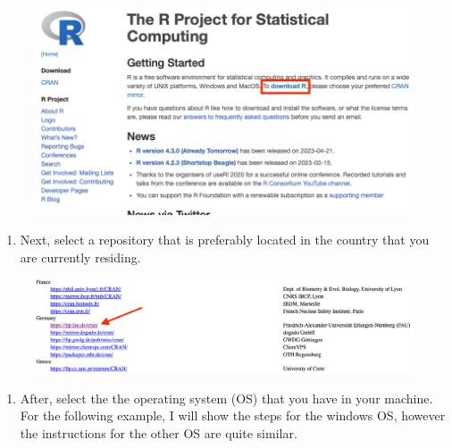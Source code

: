 \documentclass[
  letterpaper,
  DIV=11,
  numbers=noendperiod]{scrartcl}
\providecommand{\tightlist}{%
  \setlength{\itemsep}{0pt}\setlength{\parskip}{0pt}}\usepackage{longtable,booktabs,array}
\begin{document}
\begin{figure}[H]

{\centering \includegraphics[width=6.77083in,height=\textheight]{FIG1.png}

}

\end{figure}

\begin{enumerate}
\def\labelenumi{\arabic{enumi}.}
\setcounter{enumi}{1}
\tightlist
\item
  Next, select a repository that is preferably located in the country
  that you are currently residing.
\end{enumerate}

\begin{figure}[H]

{\centering \includegraphics[width=6.77083in,height=\textheight]{FIG2.png}

}

\end{figure}

\begin{enumerate}
\def\labelenumi{\arabic{enumi}.}
\setcounter{enumi}{2}
\tightlist
\item
  After, select the the operating system (OS) that you have in your
  machine. For the following example, I will show the steps for the
  windows OS, however the instructions for the other OS are quite
  similar.
\end{enumerate}
\end{document}
